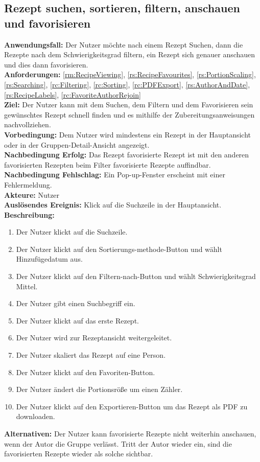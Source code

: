 \documentclass[parskip=full]{scrartcl}
\begin{document}
\subsection{Rezept suchen, sortieren, filtern, anschauen und favorisieren}
\textbf{Anwendungsfall:} Der Nutzer möchte nach einem Rezept Suchen, dann die Rezepte nach dem Schwierigkeitsgrad filtern, ein Rezept sich genauer anschauen und dies dann favorisieren.\\
\textbf{Anforderungen:} \ref{rm:RecipeViewing}, \ref{rs:RecipeFavourites}, \ref{rs:PortionScaling}, \ref{rs:Searching}, \ref{rc:Filtering}, \ref{rc:Sorting}, \ref{rc:PDFExport}, \ref{rs:AuthorAndDate}, \ref{rs:RecipeLabels}, \ref{rc:FavoriteAuthorRejoin}\\
\textbf{Ziel:} Der Nutzer kann mit dem Suchen, dem Filtern und dem Favorisieren sein gewünschtes Rezept schnell finden und es mithilfe der Zubereitungsanweisungen nachvollziehen.\\
\textbf{Vorbedingung:} Dem Nutzer wird mindestens ein Rezept in der Hauptansicht oder in der Gruppen-Detail-Ansicht angezeigt.\\
\textbf{Nachbedingung Erfolg:} Das Rezept favorisierte Rezept ist mit den anderen favorisierten Rezepten beim Filter favorisierte Rezepte auffindbar.\\
\textbf{Nachbedingung Fehlschlag:} Ein Pop-up-Fenster erscheint mit einer Fehlermeldung.\\
\textbf{Akteure:} Nutzer\\
\textbf{Auslösendes Ereignis:} Klick auf die Suchzeile in der Hauptansicht.\\
\textbf{Beschreibung:}
\begin{enumerate}
    \item Der Nutzer klickt auf die Suchzeile.
    \item Der Nutzer klickt auf den Sortierungs-methode-Button und wählt Hinzufügedatum aus.
    \item Der Nutzer klickt auf den Filtern-nach-Button und wählt Schwierigkeitsgrad Mittel.
    \item Der Nutzer gibt einen Suchbegriff ein.
    \item Der Nutzer klickt auf das erste Rezept.
    \item Der Nutzer wird zur Rezeptansicht weitergeleitet.
    \item Der Nutzer skaliert das Rezept auf eine Person.
    \item Der Nutzer klickt auf den Favoriten-Button.
    \item Der Nutzer ändert die Portionsröße um einen Zähler.
    \item Der Nutzer klickt auf den Exportieren-Button um das Rezept als PDF zu downloaden.
\end{enumerate}
\textbf{Alternativen:} Der Nutzer kann favorisierte Rezepte nicht weiterhin anschauen, wenn der Autor die Gruppe verlässt. Tritt der Autor wieder ein, sind die favorisierten Rezepte wieder als solche sichtbar.
\newpage
\end{document}
